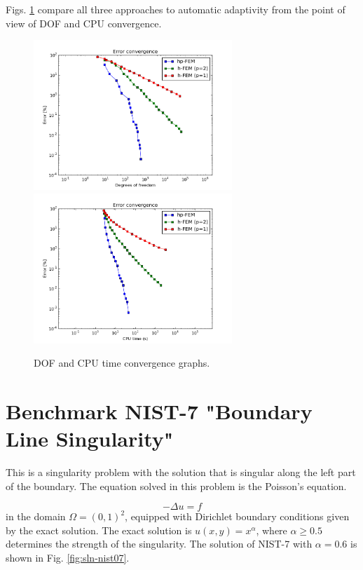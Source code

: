 \documentclass[12pt]{elsarticle}
\begin{document}
Figs. \ref{fig:nist-6-conv} compare all
three approaches to automatic adaptivity from the point
of view of DOF and CPU convergence.
\vspace{-2mm}

\begin{figure}[H]
\centering
\vspace{-2mm}
\hspace{-50mm}
\includegraphics[width=7.5cm]{nist/nist-6/conv_dof_aniso.png}\ \
\hspace{-10mm}
\includegraphics[width=7.5cm]{nist/nist-6/conv_cpu_aniso.png}
\hspace{-50mm}
\caption{DOF and CPU time convergence graphs.}
\vspace{-2mm}
\label{fig:nist-6-conv}
\end{figure}


\section{Benchmark NIST-7 "Boundary Line Singularity"}
\label{sec:bench-7}

This is a singularity problem with the solution that is singular along the left part of the boundary.
The equation solved in this problem is the Poisson's equation.

\begin{equation} \label{boundary-line-singularity}
-\Delta u = f
\end{equation}
in the domain $\Omega = (0, 1)^2$, equipped with Dirichlet boundary conditions
given by the exact solution. The exact solution is
$u(x,y) = x^{\alpha}$,
where $\alpha \geq 0.5$ determines the strength of the singularity.
The solution of NIST-7 with $\alpha = 0.6$ is shown in Fig. \ref{fig:sln-nist07}.
\end{document}

